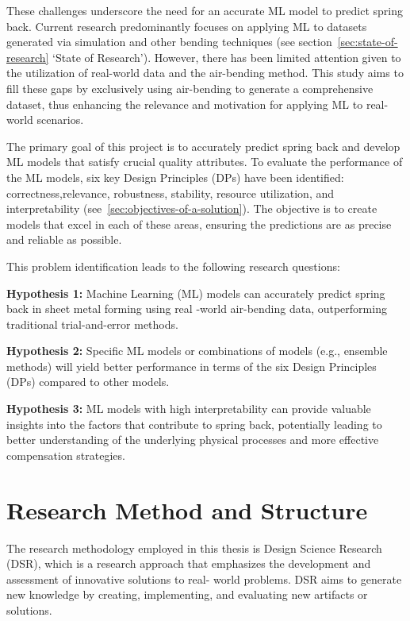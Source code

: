 These challenges underscore the need for an accurate ML model to predict spring back.
Current research predominantly focuses on applying ML to datasets generated via simulation and other bending
techniques (see section~\ref{sec:state-of-research} `State of Research').
However, there has been limited attention given to the utilization of real-world data and the air-bending method.
This study aims to fill these gaps by exclusively using air-bending to generate a comprehensive dataset, thus
enhancing the relevance and motivation for applying ML to real-world scenarios.

The primary goal of this project is to accurately predict spring back and develop \ac{ML} models that satisfy crucial
quality attributes.
To evaluate the performance of the ML models, six key Design Principles (DPs) have been identified:
correctness,relevance, robustness, stability, resource utilization, and interpretability
(see~\ref{sec:objectives-of-a-solution}).
The objective is to create models that excel in each of these areas, ensuring the predictions are as precise and
reliable as possible.

This problem identification leads to the following research questions:

\begin{tcolorbox}[arc=0pt,boxrule=0.5pt]
    \textbf{Hypothesis 1:} Machine Learning (ML) models can accurately predict spring back in sheet metal forming using
    real -world air-bending data, outperforming traditional trial-and-error methods.

    \textbf{Hypothesis 2:} Specific ML models or combinations of models (e.g., ensemble methods) will yield better
    performance
    in terms of the six Design Principles (DPs) compared to other models.

    \textbf{Hypothesis 3:} ML models with high interpretability can provide valuable insights into the factors that
    contribute to spring back, potentially leading to better understanding of the underlying physical processes and
    more effective compensation strategies.
\end{tcolorbox}


\section{Research Method and Structure}\label{sec:research-method-and-structure}
The research methodology employed in this thesis is Design Science Research (DSR), which is a
research approach that emphasizes the development and assessment of innovative solutions to real-
world problems.
DSR aims to generate new knowledge by creating, implementing, and evaluating new artifacts or
solutions.

